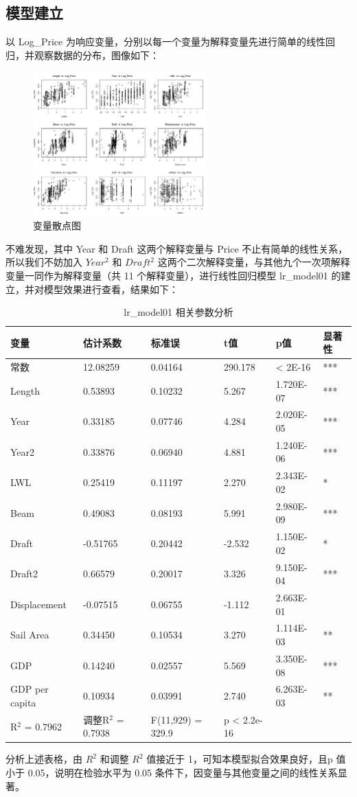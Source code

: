 \documentclass[a4paper,12pt,onecolumn,oneside]{article}
\begin{document}
\subsection{模型建立}
以 Log\_Price 为响应变量，分别以每一个变量为解释变量先进行简单的线性回归，并观察数据的分布，图像如下：
	\begin{figure}[H]
	\centering
	\includegraphics[width=0.6\textwidth]{res/sandian.png}
	\caption{变量散点图}
	\label{fig:sandian}
\end{figure}
不难发现，其中 Year 和 Draft 这两个解释变量与 Price 不止有简单的线性关系，所以我们不妨加入 $Year^2$ 和 $Draft^2$ 这两个二次解释变量，与其他九个一次项解释变量一同作为解释变量（共 11 个解释变量），进行线性回归模型 lr\_model01 的建立，并对模型效果进行查看，结果如下：\par 
\begin{table}[h]
	\centering
	\caption{lr\_model01 相关参数分析}\vspace{0.25\baselineskip}
	\begin{tabular}{@{}llllll@{}}
		\hline
		变量 & 估计系数 & 标准误 & t值 & p值 & 显著性 \\
		\hline
		常数 & 12.08259 & 0.04164 & 290.178 & < 2E-16 & *** \\
		Length & 0.53893 & 0.10232 & 5.267 & 1.720E-07 & *** \\
		Year & 0.33185 & 0.07746 & 4.284 & 2.020E-05 & *** \\
		Year2 & 0.33876 & 0.06940 & 4.881 & 1.240E-06 & *** \\
		LWL & 0.25419 & 0.11197 & 2.270 & 2.343E-02 & * \\
		Beam & 0.49083 & 0.08193 & 5.991 & 2.980E-09 & *** \\
		Draft & -0.51765 & 0.20442 & -2.532 & 1.150E-02 & * \\
		Draft2 & 0.66579 & 0.20017 & 3.326 & 9.150E-04 & *** \\
		Displacement & -0.07515 & 0.06755 & -1.112 & 2.663E-01 & \\
		Sail Area & 0.34450 & 0.10534 & 3.270 & 1.114E-03 & ** \\
		GDP & 0.14240 & 0.02557 & 5.569 & 3.350E-08 & *** \\
		GDP per capita & 0.10934 & 0.03991 & 2.740 & 6.263E-03 & ** \\
		\midrule
		R$^2$ = 0.7962& 调整R$^2$ = 0.7938& F(11,929) = 329.9& p < 2.2e-16& &\\ \bottomrule
		\end{tabular}
\end{table}
分析上述表格，由 $R^2$ 和调整 $R^2$ 值接近于 1，可知本模型拟合效果良好，且p 值小于 0.05，说明在检验水平为 0.05 条件下，因变量与其他变量之间的线性关系显著。
\end{document}

